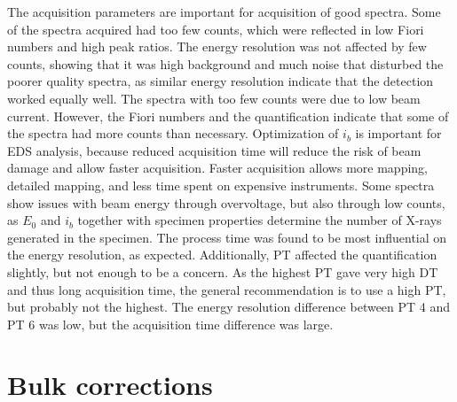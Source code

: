 The acquisition parameters are important for acquisition of good spectra.
Some of the spectra acquired had too few counts, which were reflected in low Fiori numbers and high peak ratios.
The energy resolution was not affected by few counts, showing that it was high background and much noise that disturbed the poorer quality spectra, as similar energy resolution indicate that the detection worked equally well.
The spectra with too few counts were due to low beam current.
However, the Fiori numbers and the quantification indicate that some of the spectra had more counts than necessary.
Optimization of $i_b$ is important for EDS analysis, because reduced acquisition time will reduce the risk of beam damage and allow faster acquisition.
Faster acquisition allows more mapping, detailed mapping, and less time spent on expensive instruments.
Some spectra show issues with beam energy through overvoltage, but also through low counts, as  $E_0$ and $i_b$ together with specimen properties determine the number of X-rays generated in the specimen.
The process time was found to be most influential on the energy resolution, as expected.
Additionally, PT affected the quantification slightly, but not enough to be a concern.
As the highest PT gave very high DT and thus long acquisition time, the general recommendation is to use a high PT, but probably not the highest.
The energy resolution difference between PT 4 and PT 6 was low, but the acquisition time difference was large.


\clearpage























\section{Bulk corrections}
\label{discussion:bulk_corrections}


